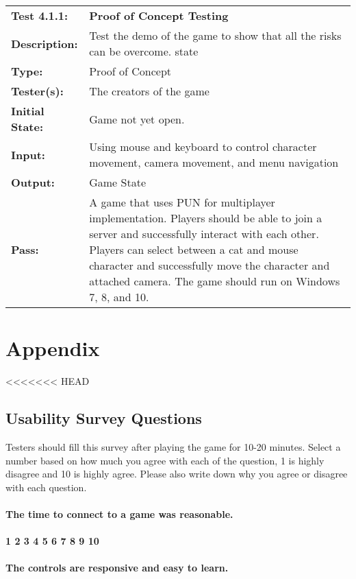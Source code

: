 \documentclass[12pt, titlepage]{article}
\begin{document}
\begin{enumerate}
\begin{mdframed}[linewidth=1pt]
\begin{tabularx}{\textwidth}{@{}p{3cm}X@{}}
{\bf Test 4.1.1:} & {\bf Proof of Concept Testing}\\[\baselineskip]
{\bf Description:} & Test the demo of the game to show that all the risks can be overcome. state\\[0.5\baselineskip]
{\bf Type:} & Proof of Concept\\[0.5\baselineskip]
{\bf Tester(s):} & The creators of the game\\[0.5\baselineskip]
{\bf Initial State:} & Game not yet open.\\[0.5\baselineskip]
{\bf Input:} & Using mouse and keyboard to control character movement, camera movement, and menu navigation\\[0.5\baselineskip]
{\bf Output:} & Game State\\[0.5\baselineskip]
{\bf Pass:} & A game that uses PUN for multiplayer implementation. Players should be able to join a server and successfully interact with each other. Players can select between a cat and mouse character and successfully move the character and attached camera. The game should run on Windows 7, 8, and 10.
\end{tabularx}
\end{mdframed}


\newpage
\section{Appendix}
<<<<<<< HEAD

\subsection{Usability Survey Questions}
Testers should fill this survey after playing the game for 10-20 minutes.
Select a number based on how much you agree with each of the question, 1 is highly disagree and 10 is highly agree. Please also write down why you agree or disagree with each question.

\paragraph{The time to connect to a game was reasonable.}
\paragraph{1 2 3 4 5 6 7 8 9 10}
\paragraph{The controls are responsive and easy to learn.}

\end{enumerate}
\end{document}
